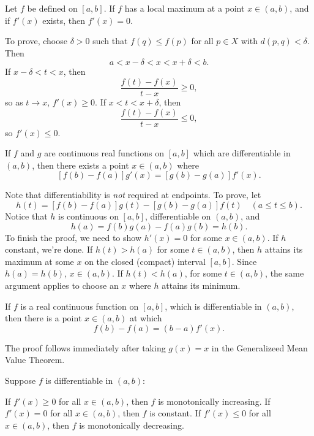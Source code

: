\documentclass{article}
\begin{document}
\begin{theorem}
    Let $f$ be defined on $[a,b]$. If $f$ has a local maximum at a point $x\in(a,b)$, and if $f'(x)$ exists, then $f'(x)=0$.
\end{theorem}
\begin{remark}
    To prove, choose $\delta>0$ such that $f(q)\leq f(p)$ for all $p\in X$ with $d(p,q)<\delta$. Then \[a<x-\delta<x<x+\delta<b.\]If $x-\delta<t<x$, then \[\frac{f(t)-f(x)}{t-x}\geq0,\]so as $t\rightarrow x$, $f'(x)\geq0$. If $x<t<x+\delta$, then 
    \[\frac{f(t)-f(x)}{t-x}\leq 0,\]so $f'(x)\leq 0$.
\end{remark}
\begin{theorem}
    If $f$ and $g$ are continuous real functions on $[a,b]$ which are differentiable in $(a,b)$, then there exists a point $x\in (a,b)$ where \[[f(b)-f(a)]g'(x)=[g(b)-g(a)]f'(x).\]
\end{theorem}
\begin{remark}
    Note that differentiability is \textit{not} required at endpoints. To prove, let \[h(t)=[f(b)-f(a)]g(t)-[g(b)-g(a)]f(t)\quad(a\leq t\leq b).\]
    Notice that $h$ is continuous on $[a,b]$, differentiable on $(a,b)$, and \[h(a)=f(b)g(a)-f(a)g(b)=h(b).\]To finish the proof, we need to show $h'(x)=0$ for some $x\in(a,b)$. If $h$ constant, we're done. If $h(t)>h(a)$ for some $t\in(a,b)$, then $h$ attains its maximum at some $x$ on the closed (compact) interval $[a,b]$. Since $h(a)=h(b)$, $x\in(a,b)$. If $h(t)<h(a)$, for some $t\in(a,b)$, the same argument applies to choose an $x$ where $h$ attains its minimum. 
\end{remark}
\begin{theorem}
    If $f$ is a real continuous function on $[a,b]$, which is differentiable in $(a,b)$, then there is a point $x\in(a,b)$ at which \[f(b)-f(a)=(b-a)f'(x).\]
\end{theorem}
\begin{remark}
    The proof follows immediately after taking $g(x)=x$ in the Generalizeed Mean Value Theorem.
\end{remark}
\begin{theorem}
    Suppose $f$ is differentiable in $(a,b)$:
    \begin{enumerate}
        \ii If $f'(x)\geq 0$ for all $x\in(a,b)$, then $f$ is monotonically increasing.
        \ii If $f'(x)=0$ for all $x\in(a,b)$, then $f$ is constant.
        \ii If $f'(x)\leq 0$ for all $x\in(a,b)$, then $f$ is monotonically decreasing.
    \end{enumerate}
\end{theorem}
\end{document}
